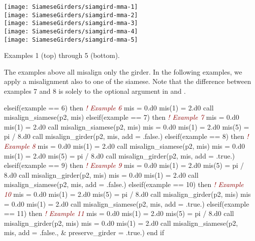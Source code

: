 \begin{marginfigure}[-13.1cm]\forcerectofloat
  \texttt{[image: SiameseGirders/siamgird-mma-1]}%
  \makebox[0pt]{\textcolor{DarkRed}{1}}\\[14pt]\noindent
  \texttt{[image: SiameseGirders/siamgird-mma-2]}%
  \makebox[0pt]{\textcolor{DarkRed}{2}}\\[14pt] \noindent
  \texttt{[image: SiameseGirders/siamgird-mma-3]}%
  \makebox[0pt]{\textcolor{DarkRed}{3}}\\[14pt] \noindent
  \texttt{[image: SiameseGirders/siamgird-mma-4]}%
  \makebox[0pt]{\textcolor{DarkRed}{4}}\\[14pt] \noindent
  \texttt{[image: SiameseGirders/siamgird-mma-5]}%
  \makebox[0pt]{\textcolor{DarkRed}{5}}
  \caption{Examples 1 (top) through 5 (bottom).}
\end{marginfigure}

The examples above all misalign only the girder. In the following examples, we apply a misalignment also to one of the siamese. Note that the difference between examples 7 and 8 is solely to the optional argument  in  and .
%
\begin{ptccode}
elseif(example == 6) then        \textcolor{DarkRed}{\textsl{! Example 6}}
  mis = 0.d0
  mis(1) = 2.d0
  call misalign_siamese(p2, mis)
elseif(example == 7) then        \textcolor{DarkRed}{\textsl{! Example 7}}
  mis = 0.d0
  mis(1) = 2.d0
  call misalign_siamese(p2, mis)
  mis = 0.d0
  mis(1) = 2.d0
  mis(5) = pi / 8.d0
  call misalign_girder(p2, mis, add = .false.) \label{lin:mis.x7}
elseif(example == 8) then        \textcolor{DarkRed}{\textsl{! Example 8}}
  mis = 0.d0
  mis(1) = 2.d0
  call misalign_siamese(p2, mis)
  mis = 0.d0
  mis(1) = 2.d0
  mis(5) = pi / 8.d0
  call misalign_girder(p2, mis, add = .true.) \label{lin:mis.x8}
elseif(example == 9) then        \textcolor{DarkRed}{\textsl{! Example 9}}
  mis = 0.d0
  mis(1) = 2.d0
  mis(5) = pi / 8.d0
  call misalign_girder(p2, mis)
  mis = 0.d0
  mis(1) = 2.d0
  call misalign_siamese(p2, mis, add = .false.)
elseif(example == 10) then       \textcolor{DarkRed}{\textsl{! Example 10}}
  mis = 0.d0
  mis(1) = 2.d0
  mis(5) = pi / 8.d0
  call misalign_girder(p2, mis)
  mis = 0.d0
  mis(1) = 2.d0
  call misalign_siamese(p2, mis, add = .true.)
elseif(example == 11) then       \textcolor{DarkRed}{\textsl{! Example 11}}
  mis = 0.d0
  mis(1) = 2.d0
  mis(5) = pi / 8.d0
  call misalign_girder(p2, mis)
  mis = 0.d0
  mis(1) = 2.d0
  call misalign_siamese(p2, mis, add = .false., &
                        preserve_girder = .true.)
end if
\end{ptccode}

